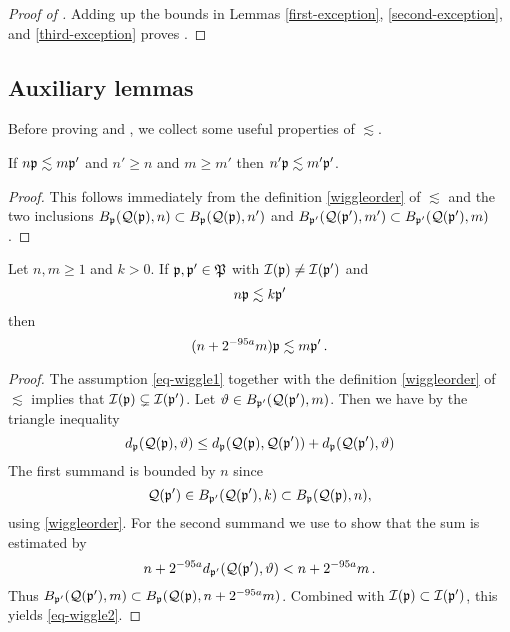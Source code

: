 \begin{proof}[Proof of ]
    \leanok
Adding up the bounds in Lemmas \ref{first-exception}, \ref{second-exception}, and \ref{third-exception} proves .
\end{proof}


\subsection{Auxiliary lemmas}
\label{subsec-lessim-aux}
Before proving  and , we collect some useful properties of $\lesssim$.

\begin{lemma}
    \label{wiggle-order-1}
    \leanok
    If $n{\mathfrak p} \lesssim m{\mathfrak p}'$ and
    $n' \ge n$ and $m \ge m'$ then $n'{\mathfrak p} \lesssim m'{\mathfrak p}'$.
\end{lemma}

\begin{proof}
    \leanok
    This follows immediately from the definition \eqref{wiggleorder} of $\lesssim$ and the two inclusions $B_{{\mathfrak p}}({\mathcal{Q}}({\mathfrak p}), n) \subset B_{{\mathfrak p}}({\mathcal{Q}}({\mathfrak p}), n')$ and $B_{{\mathfrak p}'}({\mathcal{Q}}({\mathfrak p}'), m') \subset B_{{\mathfrak p}'}({\mathcal{Q}}({\mathfrak p}'), m)$.
\end{proof}

\begin{lemma}
    \label{wiggle-order-2}
    \leanok

    Let $n, m \ge 1$ and $k > 0$.
    If ${\mathfrak p}, {\mathfrak p}' \in {\mathfrak P}$ with ${\mathcal{I}}({\mathfrak p}) \ne {\mathcal{I}}({\mathfrak p}')$ and
    \begin{equation}
        \label{eq-wiggle1}
        n {\mathfrak p} \lesssim k {\mathfrak p}'
    \end{equation}
    then
    \begin{equation}
        \label{eq-wiggle2}
        (n + 2^{-95 a} m) {\mathfrak p} \lesssim m{\mathfrak p}'\,.
    \end{equation}
\end{lemma}

\begin{proof}
    \leanok
    The assumption \eqref{eq-wiggle1} together with the definition \eqref{wiggleorder} of $\lesssim$ implies that ${\mathcal{I}}({\mathfrak p}) \subsetneq {\mathcal{I}}({\mathfrak p}')$. Let ${\vartheta} \in B_{{\mathfrak p}'}({\mathcal{Q}}({\mathfrak p}'), m)$. Then we have by the triangle inequality
    $$
        d_{{\mathfrak p}}({\mathcal{Q}}({\mathfrak p}), {\vartheta}) \le d_{{\mathfrak p}}({\mathcal{Q}}({\mathfrak p}), {\mathcal{Q}}({\mathfrak p}')) + d_{{\mathfrak p}}({\mathcal{Q}}({\mathfrak p}'), {\vartheta})
    $$
    The first summand is bounded by $n$ since
    $$
        {\mathcal{Q}}({\mathfrak p}') \in B_{{\mathfrak p}'}({\mathcal{Q}}({\mathfrak p}'), k) \subset B_{{\mathfrak p}}({\mathcal{Q}}({\mathfrak p}), n),
    $$
    using \eqref{wiggleorder}. For the second summand we use 
    to show that the sum is estimated by
    $$
        n + 2^{-95a} d_{{\mathfrak p}'}({\mathcal{Q}}({\mathfrak p}'), {\vartheta}) < n + 2^{-95a} m\,.
    $$
    Thus $B_{{\mathfrak p}'}({\mathcal{Q}}({\mathfrak p}'),m) \subset B_{{\mathfrak p}}({\mathcal{Q}}({\mathfrak p}),n + 2^{-95a}m)$. Combined with ${\mathcal{I}}({\mathfrak p}) \subset {\mathcal{I}}({\mathfrak p}')$, this yields \eqref{eq-wiggle2}.
\end{proof}

